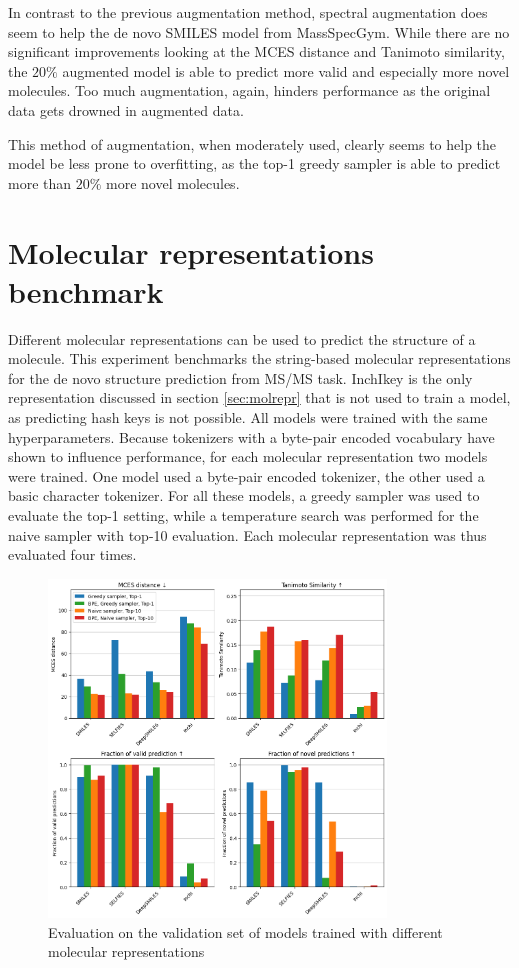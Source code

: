 In contrast to the previous augmentation method, spectral augmentation does seem to help the de novo SMILES model from MassSpecGym.
While there are no significant improvements looking at the MCES distance and Tanimoto similarity, the $20\%$ augmented model is able to predict more valid and especially more novel molecules.
Too much augmentation, again, hinders performance as the original data gets drowned in augmented data.

This method of augmentation, when moderately used, clearly seems to help the model be less prone to overfitting, as the top-1 greedy sampler is able to predict more than $20\%$ more novel molecules. 

\section{Molecular representations benchmark}

Different molecular representations can be used to predict the structure of a molecule.
This experiment benchmarks the string-based molecular representations for the de novo structure prediction from \ac{MS/MS} task.
InchIkey is the only representation discussed in section \ref{sec:molrepr} that is not used to train a model, as predicting hash keys is not possible.
All models were trained with the same hyperparameters.
Because tokenizers with a byte-pair encoded vocabulary have shown to influence performance, for each molecular representation two models were trained.
One model used a byte-pair encoded tokenizer, the other used a basic character tokenizer.
For all these models, a greedy sampler was used to evaluate the top-1 setting, while a temperature search was performed for the naive sampler with top-10 evaluation.
Each molecular representation was thus evaluated four times.

\begin{figure}[h]
    \centering
    \includegraphics[width=0.8\textwidth]{figures/results/representations_with_tanimoto.png}
    \caption{Evaluation on the validation set of models trained with different molecular representations}
    \label{fig:representations}
\end{figure}

